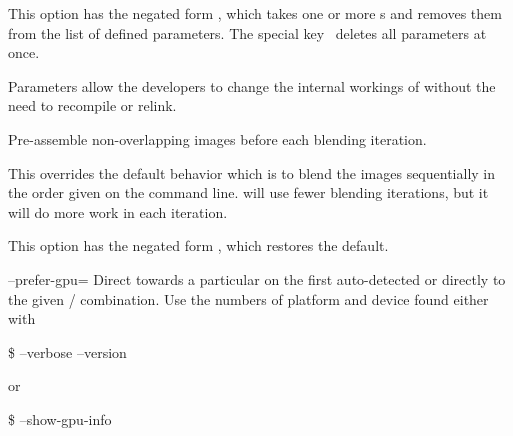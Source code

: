 \begin{codelist}
  This option has the negated form %
  , which takes one or more s and removes them from the list
  of defined parameters.  The special key~\sample{*} deletes all parameters at once.

  Parameters allow the developers to change the internal workings of \App{} without the need to
  recompile or relink.

\begin{sgquote}

\end{sgquote}


\ifenblend
    \label{opt:pre-assemble}%
  \item[\itempar{-a \\ --pre-assemble}]\itemend
    Pre-assemble non-overlapping images before each blending iteration.

    This overrides the default behavior which is to blend the images sequentially in the order
    given on the command line.  \App{} will use fewer blending iterations, but it will do more
    work in each iteration.

    This option has the negated form %
    , which restores the default.
\fi


  \label{opt:prefer-gpu}%
\item[--prefer-gpu=\optional{\metavar{PLATFORM}:}\metavar{DEVICE}
  \restrictednote{\acronym{OpenCL}-enabled versions only.}]\itemend
  Direct \App{} towards a particular   on the first
  auto-detected  or directly to the given
  \slash{} combination.  Use the numbers of platform and device
  found either with

  \begin{terminal}
    \$ \app{} --verbose --version
  \end{terminal}
  or
  \begin{terminal}
    \$ \app{} --show-gpu-info
  \end{terminal}


\end{codelist}
